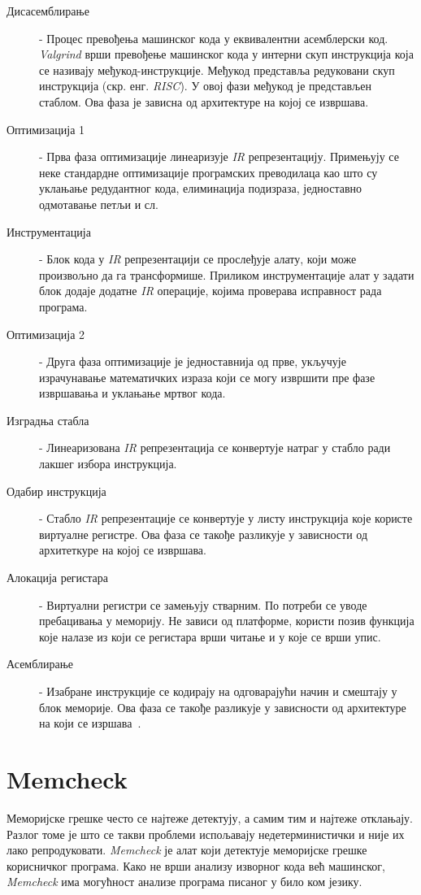 \documentclass[12pt,oneside]{memoir}
\begin{document}
\begin{description}
	\item[Дисасемблирање] - Процес превођења машинског кода у еквивалентни асемблерски код. \textit{Valgrind} врши превођење машинског кода у интерни скуп инструкција која се називају међукод-инструкције. Међукод представља редуковани скуп инструкција (скр. енг. \textit{RISC}). У овој фази међукод је представљен стаблом. Ова фаза је зависна од архитектуре на којој се извршава.
	\item[Оптимизација 1] - Прва фаза оптимизације линеаризује \textit{IR} репрезентацију. Примењују се неке стандардне оптимизације програмских преводилаца као што су уклањање редудантног кода, елиминација подизраза, једноставно одмотавање петљи и сл.
	\item[Инструментација] - Блок кода у \textit{IR} репрезентацији се прослеђује алату, који може произвољно да га трансформише. Приликом инструментације алат у задати блок додаје додатне \textit{IR} операције, којима проверава исправност рада програма.
	\item[Оптимизација 2] - Друга фаза оптимизације је једноставнија од прве, укључује израчунавање математичких израза који се могу извршити пре фазе извршавања и уклањање мртвог кода.
	\item[Изградња стабла] - Линеаризована \textit{IR} репрезентација се конвертује натраг у стабло ради лакшег избора инструкција.
	\item[Одабир инструкција] - Стабло \textit{IR} репрезентације се конвертује у листу инструкција које користе виртуалне регистре. Ова фаза се такође разликује у зависности од архитеткуре на којој се извршава.
	\item[Алокација регистара] - Виртуални регистри се замењују стварним. По потреби се уводе пребацивања у меморију. Не зависи од платформе, користи позив функција које налазе из који се регистара врши читање и у које се врши упис.
	\item[Асемблирање] - Изабране инструкције се кодирају на одговарајући начин и смештају у блок меморије. Ова фаза се такође разликује у зависности  од архитектуре на који се изршава~\cite{SeeMIPSRun}.
\end{description}

\section{Memcheck}
\label{section_memcheck}

\indent Меморијске грешке често се најтеже детектују, а самим тим и најтеже отклањају. Разлог томе је што се такви проблеми испољавају недетерминистички и није их лако репродуковати. \textit{Memcheck} је алат који детектује меморијске грешке корисничког програма. Како не врши анализу изворног кода већ машинског, \textit{Memcheck} има могућност анализе програма писаног у било ком језику.
\end{document}
